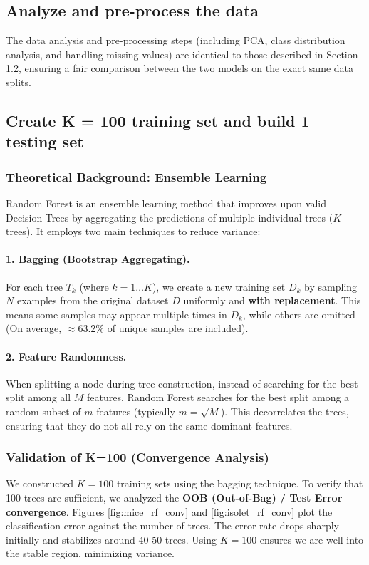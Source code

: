 \documentclass[12pt]{article}
\begin{document}
\subsection{Analyze and pre-process the data}
The data analysis and pre-processing steps (including PCA, class distribution analysis, and handling missing values) are identical to those described in Section 1.2, ensuring a fair comparison between the two models on the exact same data splits.

\subsection{Create K = 100 training set and build 1 testing set}

\subsubsection{Theoretical Background: Ensemble Learning}
Random Forest is an ensemble learning method that improves upon valid Decision Trees by aggregating the predictions of multiple individual trees ($K$ trees). It employs two main techniques to reduce variance:

\paragraph{1. Bagging (Bootstrap Aggregating).} 
For each tree $T_k$ (where $k=1 \dots K$), we create a new training set $D_k$ by sampling $N$ examples from the original dataset $D$ uniformly and \textbf{with replacement}. This means some samples may appear multiple times in $D_k$, while others are omitted (On average, $\approx 63.2\%$ of unique samples are included).

\paragraph{2. Feature Randomness.}
When splitting a node during tree construction, instead of searching for the best split among all $M$ features, Random Forest searches for the best split among a random subset of $m$ features (typically $m = \sqrt{M}$). This decorrelates the trees, ensuring that they do not all rely on the same dominant features.

\subsubsection{Validation of K=100 (Convergence Analysis)}
We constructed $K=100$ training sets using the bagging technique. To verify that 100 trees are sufficient, we analyzed the \textbf{OOB (Out-of-Bag) / Test Error convergence}. 
Figures \ref{fig:mice_rf_conv} and \ref{fig:isolet_rf_conv} plot the classification error against the number of trees. The error rate drops sharply initially and stabilizes around 40-50 trees. Using $K=100$ ensures we are well into the stable region, minimizing variance.
\end{document}
